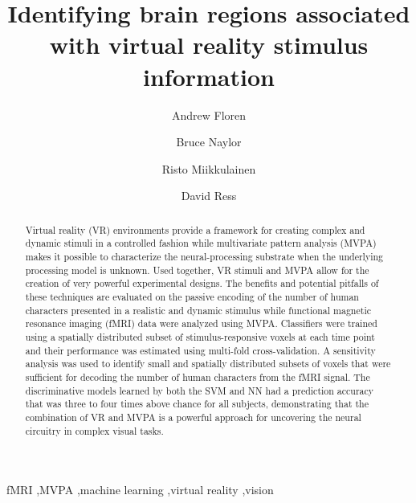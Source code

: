 \documentclass[5p,authoryear]{elsarticle}
\begin{document}
\begin{frontmatter}

\title{Identifying brain regions associated with virtual reality stimulus information}

\author[ECE,NS]{Andrew Floren}

\author[NS]{Bruce Naylor}

\author[CS]{Risto Miikkulainen}

\author[BCM]{David Ress}

\address[ECE]{Department of Electrical and Computer Engineering}
\address[NS]{Department of Neuroscience}
\address[CS]{Computer Science Department \\ The University of Texas at Austin, Austin, TX 78712 USA}
\address[BCM]{Department of Neuroscience \\ Baylor College of Medicine, Houston, TX 77030 USA}


\begin{abstract}
Virtual reality (VR) environments provide a framework for creating complex and dynamic stimuli in a controlled fashion while multivariate pattern analysis (MVPA) makes it possible to characterize the neural-processing substrate when the underlying processing model is unknown. 
Used together, VR stimuli and MVPA allow for the creation of very powerful experimental designs. 
The benefits and potential pitfalls of these techniques are evaluated on the passive encoding of the number of human characters presented in a realistic and dynamic stimulus while functional magnetic resonance imaging (fMRI) data were analyzed using MVPA. 
Classifiers were trained using a spatially distributed subset of stimulus-responsive voxels at each time point and their performance was estimated using multi-fold cross-validation.
A sensitivity analysis was used to identify small and spatially distributed subsets of voxels that were sufficient for decoding the number of human characters from the fMRI signal.
The discriminative models learned by both the SVM and NN had a prediction accuracy that was three to four times above chance for all subjects, demonstrating that the combination of VR and MVPA is a powerful approach for uncovering the neural circuitry in complex visual tasks.
\end{abstract}

\begin{keyword}
fMRI \sep MVPA \sep machine learning \sep virtual reality \sep vision
\end{keyword}

\end{frontmatter}
\end{document}
